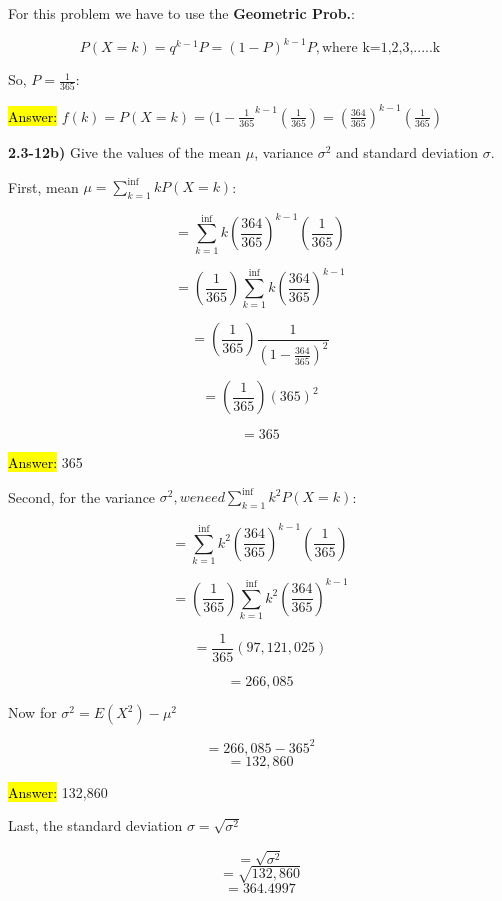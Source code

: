 \documentclass{article}
\begin{document}
\vspace{2mm}

For this problem we have to use the \textbf{Geometric Prob.}:

$$P(X=k)=q^{k-1}P=(1-P)^{k-1}P, \text{where k=1,2,3,.....k}$$

So, $P=\frac{1}{365}$:

\vspace{2mm}

\hl{Answer:} $f(k)=P(X=k)=(1-\frac{1}{365}^{k-1}(\frac{1}{365}) = (\frac{364}{365})^{k-1}(\frac{1}{365})$



\vspace{5mm}


\textbf{2.3-12b)} Give the values of the mean $\mu$, variance $\sigma^{2}$ and standard  deviation $\sigma$.
 
 First, mean $\mu=\sum_{k=1}^{\inf} k P(X=k)$:
 
 $$=\sum_{k=1}^{\inf}k(\frac{364}{365})^{k-1}(\frac{1}{365})$$
 
 $$=(\frac{1}{365})\sum_{k=1}^{\inf}k(\frac{364}{365})^{k-1}$$
 
 $$=(\frac{1}{365})\frac{1}{(1- \frac{364}{365})^{2}}$$
 
  
 $$=(\frac{1}{365})(365)^{2}$$
 
 $$=365$$
 
 \vspace{2mm}
 
 \hl{Answer:} 365
 
 
 Second, for the variance $\sigma^{2}, we need  \sum_{k=1}^{\inf} k^{2} P(X=k)$:
 
 $$=\sum_{k=1}^{\inf}k^{2}(\frac{364}{365})^{k-1}(\frac{1}{365})$$
 
 $$=(\frac{1}{365})\sum_{k=1}^{\inf}k^{2}(\frac{364}{365})^{k-1}$$

 
 $$=\frac{1}{365}(97,121,025)$$
 
  $$=266,085$$
  
  \vspace{2mm}
  
  Now for $\sigma^{2}=E(X^{2})-\mu^{2}$
  
  $$=266,085-365^{2}$$
  $$=132,860$$
  
 
 \hl{Answer:} 132,860
 
  \vspace{2mm}
  
 Last, the standard  deviation $\sigma = \sqrt{\sigma^{2}}$
 
$$=\sqrt{\sigma^{2}}$$
$$=\sqrt{132,860}$$
$$=364.4997$$ 
\end{document}
